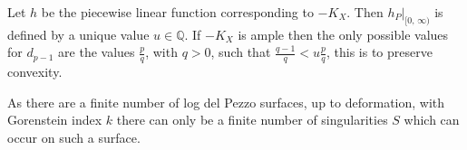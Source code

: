 \documentclass[12pt,a4paper]{book}      %
\theoremstyle{definition}
\newtheorem{algorithm}{Algorithm}
\newcommand{\mb}[1]{\mathbb{#1}}
\begin{document}
Let $h$ be the piecewise linear function corresponding to $-K_X$. Then $h_P|_{[0, \, \infty)}$ is defined by a unique value $u \in \mb{Q}$. If $-K_X$ is ample then the only possible values for $d_{p-1}$ are the values $\frac{p}{q}$, with $q >0$, such that $\frac{q-1}{q} < u\frac{p}{q}$, this is to preserve convexity. 


As there are a finite number of log del Pezzo surfaces, up to deformation, with Gorenstein index $k$ there can only be a finite number of singularities $S$ which can occur on such a surface. 

\begin{comment}
\begin{algorithm}

This algorithm classifies log del Pezzo surfaces with index $k$. The algorithm proceeds iteratively, we start with the polyhedral divisor $w_1 \otimes P_1 + w_2 \otimes P_2 + w_3 \otimes P_3 + \sum_{i = 4, \dots 6k} 0 \otimes P_i$. We can assume $w_1$ is of the form $\frac{k'}{n}$ where $k'|n$. We will show how to bound the values $n$ later. We now wish to extend this by adding an extra cone into one of the fibers such that $-K_X$ is still ample and the surface can be further compactified into a log del Pezzo surface of Gorenstein index $k$. We show there are finitely many choices and we can repeat this process until it terminates.


\end{comment}
\end{document}
